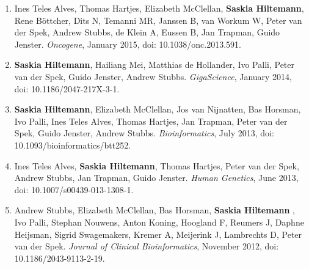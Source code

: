 \begin{enumerate}
\item Ines Teles Alves, Thomas Hartjes, Elizabeth McClellan, \textbf{Saskia Hiltemann}, Rene Böttcher, Dits N, Temanni MR, Janssen B, van Workum W, Peter van der Spek, Andrew Stubbs, de Klein A, Eussen B, Jan Trapman, Guido Jenster. {\color{chaptergrey}{Next-generation sequencing reveals novel rare fusion events with functional implication in prostate cancer.}} \textit{Oncogene}, January 2015, doi: 10.1038/onc.2013.591.

\item \textbf{Saskia Hiltemann}, Hailiang Mei, Matthias de Hollander, Ivo Palli, Peter van der Spek, Guido Jenster, Andrew Stubbs. {\color{chaptergrey}{CGtag: complete genomics toolkit and annotation in a cloud-based Galaxy.}} \textit{GigaScience}, January 2014, doi: 10.1186/2047-217X-3-1. \label{cgtag}

\item \textbf{Saskia Hiltemann}, Elizabeth McClellan, Jos van Nijnatten, Bas Horsman, Ivo Palli, Ines Teles Alves, Thomas Hartjes, Jan Trapman, Peter van der Spek, Guido Jenster, Andrew Stubbs. {\color{chaptergrey}{iFUSE: integrated fusion gene explorer.}} \textit{Bioinformatics}, July 2013, doi: 10.1093/bioinformatics/btt252. \label{ifuse}

\item Ines Teles Alves, \textbf{Saskia Hiltemann}, Thomas Hartjes, Peter van der Spek, Andrew Stubbs, Jan Trapman, Guido Jenster. {\color{chaptergrey}{Gene fusions by chromothripsis of chromosome 5q in the VCaP prostate cancer cell line.}} \textit{Human Genetics}, June 2013, doi: 10.1007/s00439-013-1308-1. \label{chromothripsis}

\item Andrew Stubbs, Elizabeth McClellan, Bas Horsman, \textbf{Saskia Hiltemann }, Ivo Palli, Stephan Nouwens, Anton Koning, Hoogland F, Reumers J, Daphne Heijsman, Sigrid Swagemakers, Kremer A, Meijerink J, Lambrechts D, Peter van der Spek. {\color{chaptergrey}{Huvariome: a web server resource of whole genome next-generation sequencing allelic frequencies to aid in pathological candidate gene selection.}} \textit{Journal of Clinical Bioinformatics}, November 2012, doi: 10.1186/2043-9113-2-19.


\end{enumerate}
